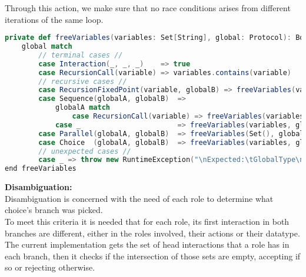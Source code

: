 Through this action, we make sure that no race conditions arises from different iterations of the same loop.\\
\pagebreak
\begin{lstlisting}[language=Scala, caption=No Free Variables]
private def freeVariables(variables: Set[String], global: Protocol): Boolean =
    global match
        // terminal cases //
        case Interaction(_, _, _)    => true
        case RecursionCall(variable) => variables.contains(variable)
        // recursive cases //
        case RecursionFixedPoint(variable, globalB) => freeVariables(variables + variable, globalB)
        case Sequence(globalA, globalB)  =>
            globalA match
                case RecursionCall(variable) => freeVariables(variables, globalA) && freeVariables(variables - variable, globalB)
            case _                       => freeVariables(variables, globalA) && freeVariables(variables, globalB)
        case Parallel(globalA, globalB)  => freeVariables(Set(), globalA) && freeVariables(Set(), globalB)
        case Choice  (globalA, globalB)  => freeVariables(variables, globalA) && freeVariables(variables, globalB)
        // unexpected cases //
        case _ => throw new RuntimeException("\nExpected:\tGlobalType\nFound:\t\tLocalType")
end freeVariables
\end{lstlisting}
\textbf{Disambiguation:}\\
Disambiguation is concerned with the need of each role to determine what choice's branch was picked.\\
To meet this criteria it is needed that for each role, its first interaction in both branches are different, either in the roles involved, their actions or their datatype. \cite{denielou2011dynamic}\\
The current implementation gets the set of head interactions that a role has in each branch, then it checks if the intersection of those sets are empty, accepting if so or rejecting otherwise.\\
